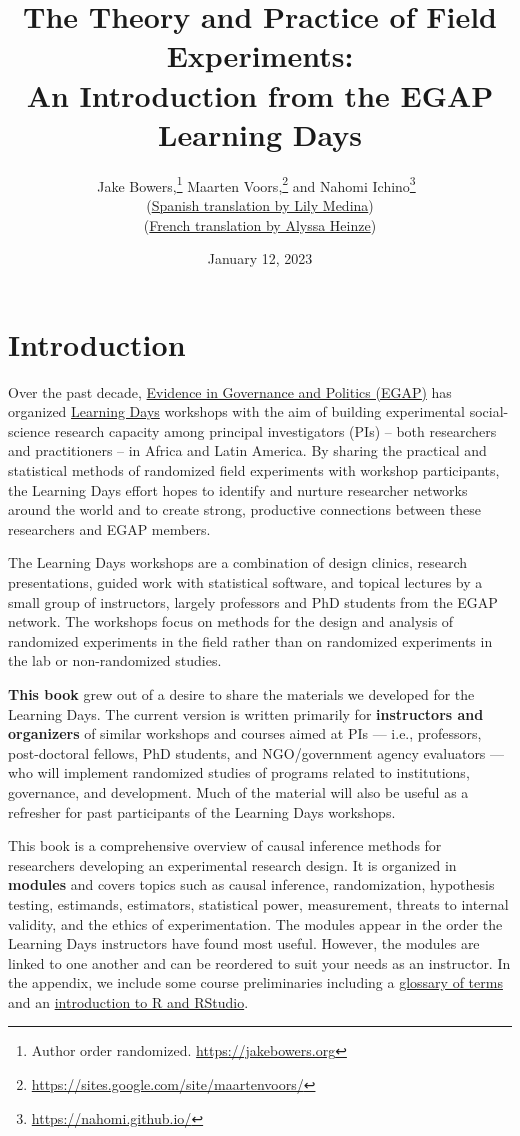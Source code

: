 \documentclass[12pt,]{book}
\title{The Theory and Practice of Field Experiments:\\
An Introduction from the EGAP Learning Days}
\author{Jake Bowers,\footnote{Author order randomized. \url{https://jakebowers.org}} Maarten Voors,\footnote{\url{https://sites.google.com/site/maartenvoors/}} and Nahomi Ichino\footnote{\url{https://nahomi.github.io/}}~\\
(\href{https://egap.github.io/theory_and_practice_of_field_experiments_spanish/}{Spanish translation by Lily Medina})\\
(\href{https://egap.github.io/theory_and_practice_of_field_experiments_french/}{French translation by Alyssa Heinze})}
\date{January 12, 2023}
\begin{document}
\maketitle

\captionsetup[table]{list=no}
\captionsetup[figure]{list=no}

{
\hypersetup{linkcolor=}
\setcounter{tocdepth}{1}
\tableofcontents
}
\hypertarget{introduction}{%
\chapter{Introduction}\label{introduction}}

Over the past decade, \href{http://egap.org/}{Evidence in Governance and Politics (EGAP)} has organized \href{https://egap.org/learning-days/}{Learning Days} workshops with the aim of building experimental social-science research capacity among principal investigators (PIs) -- both researchers and practitioners -- in Africa and Latin America. By sharing the practical and statistical methods of randomized field experiments with workshop participants, the Learning Days effort hopes to identify and nurture researcher networks around the world and to create strong, productive connections between these researchers and EGAP members.

The Learning Days workshops are a combination of design clinics, research presentations, guided work with statistical software, and topical lectures by a small group of instructors, largely professors and PhD students from the EGAP network. The workshops focus on methods for the design and analysis of randomized experiments in the field rather than on randomized experiments in the lab or non-randomized studies.

\textbf{This book} grew out of a desire to share the materials we developed for the Learning Days. The current version is written primarily for \textbf{instructors and organizers} of similar workshops and courses aimed at PIs --- i.e., professors, post-doctoral fellows, PhD students, and NGO/government agency evaluators --- who will implement randomized studies of programs related to institutions, governance, and development. Much of the material will also be useful as a refresher for past participants of the Learning Days workshops.

This book is a comprehensive overview of causal inference methods for researchers developing an experimental research design. It is organized in \textbf{modules} and covers topics such as causal inference, randomization, hypothesis testing, estimands, estimators, statistical power, measurement, threats to internal validity, and the ethics of experimentation. The modules appear in the order the Learning Days instructors have found most useful. However, the modules are linked to one another and can be reordered to suit your needs as an instructor. In the appendix, we include some course preliminaries including a \href{glossary-of-terms.html}{glossary of terms} and an \href{introduction-to-r-and-rstudio.html}{introduction to R and RStudio}.
\end{document}
